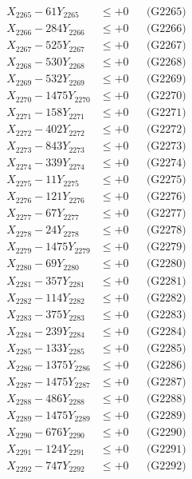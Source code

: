 \documentclass[a4paper,10pt]{article}
\begin{document}
{\begin{align}
X_{2265} - 61Y_{2265} &\leq +0 && \text{(G2265)} \\
X_{2266} - 284Y_{2266} &\leq +0 && \text{(G2266)} \\
X_{2267} - 525Y_{2267} &\leq +0 && \text{(G2267)} \\
X_{2268} - 530Y_{2268} &\leq +0 && \text{(G2268)} \\
X_{2269} - 532Y_{2269} &\leq +0 && \text{(G2269)} \\
X_{2270} - 1475Y_{2270} &\leq +0 && \text{(G2270)} \\
\allowbreak
X_{2271} - 158Y_{2271} &\leq +0 && \text{(G2271)} \\
X_{2272} - 402Y_{2272} &\leq +0 && \text{(G2272)} \\
X_{2273} - 843Y_{2273} &\leq +0 && \text{(G2273)} \\
X_{2274} - 339Y_{2274} &\leq +0 && \text{(G2274)} \\
X_{2275} - 11Y_{2275} &\leq +0 && \text{(G2275)} \\
X_{2276} - 121Y_{2276} &\leq +0 && \text{(G2276)} \\
X_{2277} - 67Y_{2277} &\leq +0 && \text{(G2277)} \\
X_{2278} - 24Y_{2278} &\leq +0 && \text{(G2278)} \\
X_{2279} - 1475Y_{2279} &\leq +0 && \text{(G2279)} \\
X_{2280} - 69Y_{2280} &\leq +0 && \text{(G2280)} \\
\allowbreak
X_{2281} - 357Y_{2281} &\leq +0 && \text{(G2281)} \\
X_{2282} - 114Y_{2282} &\leq +0 && \text{(G2282)} \\
X_{2283} - 375Y_{2283} &\leq +0 && \text{(G2283)} \\
X_{2284} - 239Y_{2284} &\leq +0 && \text{(G2284)} \\
X_{2285} - 133Y_{2285} &\leq +0 && \text{(G2285)} \\
X_{2286} - 1375Y_{2286} &\leq +0 && \text{(G2286)} \\
X_{2287} - 1475Y_{2287} &\leq +0 && \text{(G2287)} \\
X_{2288} - 486Y_{2288} &\leq +0 && \text{(G2288)} \\
X_{2289} - 1475Y_{2289} &\leq +0 && \text{(G2289)} \\
X_{2290} - 676Y_{2290} &\leq +0 && \text{(G2290)} \\
\allowbreak
X_{2291} - 124Y_{2291} &\leq +0 && \text{(G2291)} \\
X_{2292} - 747Y_{2292} &\leq +0 && \text{(G2292)} \\

\end{align}}
\end{document}

